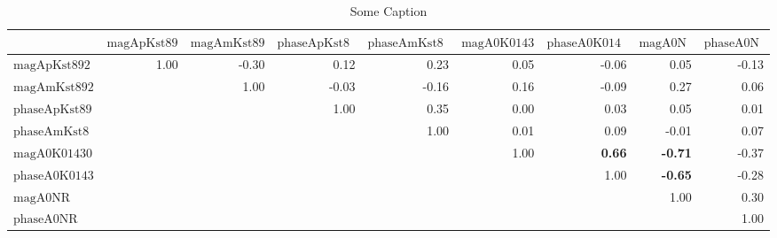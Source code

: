 \renewcommand{\pm}{\ensuremath{\oldpm} }
\begin{sidewaystable}[h]
\begin{center}
\begin{tabular}{@{}|l|r|r|r|r|r|r|r|r|@{}}
\hline
 & $\text{magApKst892}$ & $\text{magAmKst892}$ & $\text{phaseApKst892}$ & $\text{phaseAmKst892}$ & $\text{magA0K01430}$ & $\text{phaseA0K01430}$ & $\text{magA0NR}$ & $\text{phaseA0NR}$\\ \hline \hline
$\text{magApKst892}$ & 1.00 & -0.30 & 0.12 & 0.23 & 0.05 & -0.06 & 0.05 & -0.13 \\
$\text{magAmKst892}$ &  & 1.00 & -0.03 & -0.16 & 0.16 & -0.09 & 0.27 & 0.06 \\
$\text{phaseApKst892}$ &  &  & 1.00 & 0.35 & 0.00 & 0.03 & 0.05 & 0.01 \\
$\text{phaseAmKst892}$ &  &  &  & 1.00 & 0.01 & 0.09 & -0.01 & 0.07 \\
$\text{magA0K01430}$ &  &  &  &  & 1.00 & \bf{0.66} & \bf{-0.71} & -0.37 \\
$\text{phaseA0K01430}$ &  &  &  &  &  & 1.00 & \bf{-0.65} & -0.28 \\
$\text{magA0NR}$ &  &  &  &  &  &  & 1.00 & 0.30 \\
$\text{phaseA0NR}$ &  &  &  &  &  &  &  & 1.00 \\
\hline
\end{tabular}
\caption{Some Caption}
\label{thisTable}
\end{center}
\end{sidewaystable}
\renewcommand{\pm}{\oldpm}
\restoregeometry

